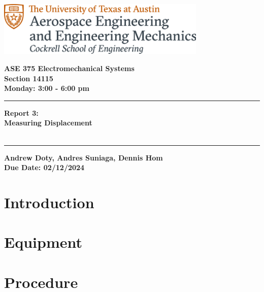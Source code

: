 \documentclass{article}
\begin{document}
\begin{titlepage}
  \centering
  \includegraphics[width=10cm]{ase-logo-formal.png}  %
  \vspace{1cm}  %
 
  \Large \textbf{ASE 375 Electromechanical Systems}\\
  \large \textbf{Section 14115}\\
  \vspace{0.5cm}
  \textbf{Monday: 3:00 - 6:00 pm}\\
 
  \vspace{1cm}
 
  \hrule
  \vspace{0.5cm}
 
  \Huge \textbf{Report 3:\\
  Measuring Displacement}\\
  \Huge \textbf{}\\
 
  \vspace{0.5cm}
  \hrule
 
  \vspace{1cm}
 
  \normalsize \textbf{Andrew Doty, Andres Suniaga, Dennis Hom}\\
  \normalsize \textbf{Due Date: 02/12/2024}
 
\end{titlepage}
\newpage

\tableofcontents
\thispagestyle{empty}
\newpage

\section{Introduction}

\section{Equipment}

\section{Procedure}
\end{document}
